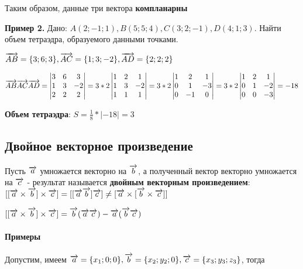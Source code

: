 \documentclass{article}
\def\vec{\ensuremath\overrightarrow}
\begin{document}
\begin{flushleft}
Таким образом, данные три вектора \textbf{компланарны}

\hfill

\textbf{Пример 2.} Дано: $A(2; -1; 1), B(5; 5; 4), C(3; 2; -1), D(4; 1; 3)$. Найти объем тетраэдра, образуемого данными точками.

$\vec{AB} = \{ 3; 6; 3 \}, \vec{AC} = \{ 1; 3; -2 \}, \vec{AD} = \{ 2; 2; 2 \}$

$\vec{AB} \vec{AC} \vec{AD} = \begin{vmatrix}
    3 & 6 & 3 \\
    1 & 3 & -2 \\
    2 & 2 & 2
\end{vmatrix} = 3 * 2 \begin{vmatrix}
    1 & 2 & 1 \\
    1 & 3 & -2 \\
    1 & 1 & 1
\end{vmatrix} = 3 * 2 \begin{vmatrix}
    1 & 2 & 1 \\
    0 & 1 & -3 \\
    0 & -1 & 0
\end{vmatrix} = 3 * 2 \begin{vmatrix}
    1 & 2 & 1 \\
    0 & 1 & -2 \\
    0 & 0 & -3
\end{vmatrix} = -18$

\textbf{Объем тетраэдра}: $S = \frac{1}{8} * |-18| = 3$

\subsection{Двойное векторное произведение}

Пусть $\vec{a}$ умножается векторно на $\vec{b}$, а полученный вектор векторно умножается на $\vec{c}$ - результат называется \textbf{двойным векторным произведением}: $[ [ \vec{a} \times \vec{b} ] \times \vec{c}] = [ [ \vec{a} \vec{b} ] \vec{c}] \ne [ \vec{a} \times [ \vec{b} \times \vec{c} ] ]$

$[ [ \vec{a} \times \vec{b} ] \times \vec{c} ] = \vec{b} (\vec{a} \vec{c}) - \vec{a} (\vec{b} \vec{c})$

\paragraph{Примеры}

\hfill

Допустим, имеем $\vec{a} = \{ x_1; 0; 0 \}, \vec{b} = \{ x_2; y_2; 0 \}, \vec{c} = \{ x_3; y_3; z_3 \}$, тогда


\end{flushleft}
\end{document}
